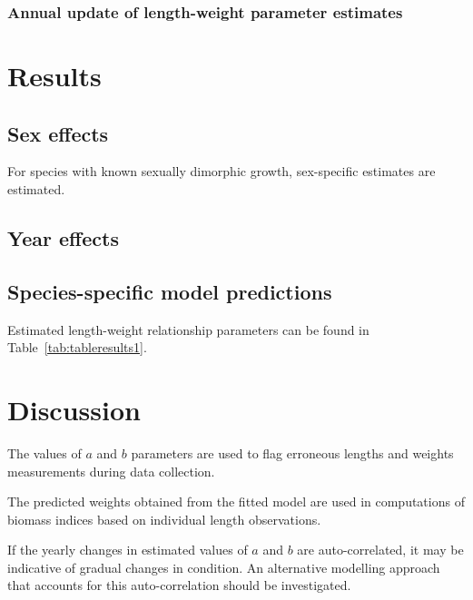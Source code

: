 \documentclass[12pt]{article}\usepackage[]{graphicx}\usepackage[]{color}
\begin{document}
\hypertarget{annual-update-of-length-weight-parameter-estimates}{%
\subsubsection{Annual update of length-weight parameter estimates}\label{annual-update-of-length-weight-parameter-estimates}}

\hypertarget{results}{%
\section{Results}\label{results}}

\hypertarget{sex-effects}{%
\subsection{Sex effects}\label{sex-effects}}

For species with known sexually dimorphic growth, sex-specific estimates are estimated.

\hypertarget{year-effects}{%
\subsection{Year effects}\label{year-effects}}

\hypertarget{species-specific-model-predictions}{%
\subsection{Species-specific model predictions}\label{species-specific-model-predictions}}

Estimated length-weight relationship parameters can be found in Table~\ref{tab:tableresults1}.

\hypertarget{discussion}{%
\section{Discussion}\label{discussion}}

The values of \(a\) and \(b\) parameters are used to flag erroneous lengths and weights measurements during data collection.

The predicted weights obtained from the fitted model are used in computations of biomass indices based on individual length observations.

If the yearly changes in estimated values of \(a\) and \(b\) are auto-correlated, it may be indicative of gradual changes in condition. An alternative modelling approach that accounts for this auto-correlation should be investigated.
\end{document}
